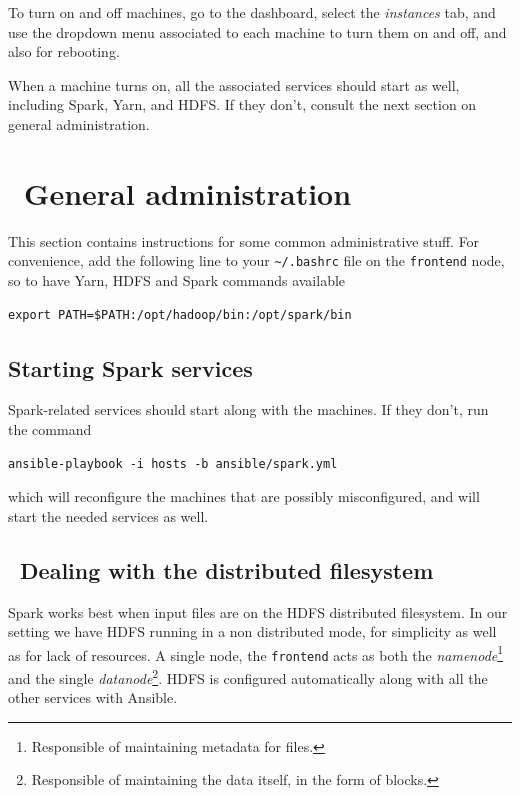 \documentclass[justified]{tufte-handout}
\begin{document}
To turn on and off machines, go to the dashboard, select the
\emph{instances} tab, and use the dropdown menu associated to each
machine to turn them on and off, and also for rebooting.

When a machine turns on, all the associated services should start as
well, including Spark, Yarn, and HDFS. If they don't, consult the next
section on general administration.

\section{~General administration}\label{general-administration}

This section contains instructions for some common administrative stuff.
For convenience, add the following line to your
\texttt{\textasciitilde{}/.bashrc} file on the \texttt{frontend} node,
so to have Yarn, HDFS and Spark commands available

\begin{verbatim}
export PATH=$PATH:/opt/hadoop/bin:/opt/spark/bin
\end{verbatim}

\subsection{Starting Spark services}\label{starting-spark-services}

Spark-related services should start along with the machines. If they
don't, run the command

\begin{verbatim}
ansible-playbook -i hosts -b ansible/spark.yml
\end{verbatim}

\noindent
which will reconfigure the machines that are possibly misconfigured, and
will start the needed services as well.

\subsection{~Dealing with the distributed
filesystem}\label{dealing-with-the-distributed-filesystem}

Spark works best when input files are on the HDFS distributed
filesystem. In our setting we have HDFS running in a non distributed
mode, for simplicity as well as for lack of resources. A single node,
the \texttt{frontend} acts as both the \emph{namenode}\footnote{Responsible
  of maintaining metadata for files.} and the single
\emph{datanode}\footnote{Responsible of maintaining the data itself, in
  the form of blocks.}. HDFS is configured automatically along with all
the other services with Ansible.
\end{document}
